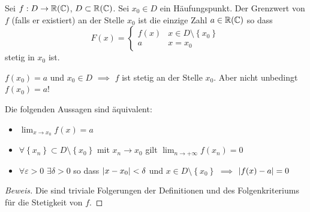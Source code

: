 
\begin{Def}
  Sei $f:D\to\mathbb{R}(\mathbb{C})$, $D\subset \mathbb{R}(\mathbb{C})$. 
Sei $x_0\in D$ ein Häufungspunkt. 
Der Grenzwert von $f$ (falls er existiert) an der Stelle 
$x_0$ ist die einzige Zahl $a\in\mathbb{R}(\mathbb{C})$ so dass
  \[F(x)=\begin{cases}
    f(x)&x\in D\setminus \left\{ x_0 \right\}\\
    a&x=x_0
  \end{cases}\]
  stetig in $x_0$ ist.
\end{Def}
\begin{Bem}
  $f(x_0)=a$ und $x_0\in D$ $\implies$ $f$ ist stetig an der Stelle $x_0$.
Aber nicht unbedingt $f(x_0)=a$!
\end{Bem}
\begin{Sat}\label{s:Ch}
  Die folgenden Aussagen sind äquivalent:
  \begin{itemize}
    \item $\lim_{x\to x_0}f(x)=a$
    \item $\forall \left\{ x_n \right\}\subset D\setminus\left\{ x_0 \right\}$ mit $x_n\to x_0$ gilt $\lim_{n\to +\infty} f(x_n)=0$
    \item $\forall \varepsilon >0$ $\exists\delta>0$ so dass $\mathopen| x-x_0 \mathclose|<\delta$ und $x\in D\setminus\left\{ x_0 \right\}$ $\implies$ $\mathopen| f(x)-a \mathclose|=0$
  \end{itemize}
\end{Sat}
\begin{proof}[Beweis] Die sind triviale Folgerungen der 
Definitionen und des Folgenkriteriums f\"ur die Stetigkeit von $f$.
\end{proof}

